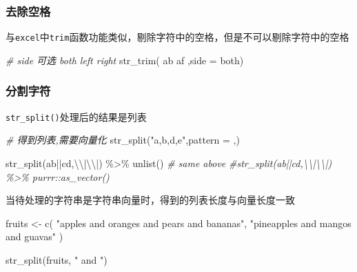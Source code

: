 \documentclass[
]{book}
\newenvironment{Shaded}{\begin{snugshade}}{\end{snugshade}}
\newcommand{\AttributeTok}[1]{\textcolor[rgb]{0.77,0.63,0.00}{#1}}
\newcommand{\CommentTok}[1]{\textcolor[rgb]{0.56,0.35,0.01}{\textit{#1}}}
\newcommand{\FunctionTok}[1]{\textcolor[rgb]{0.00,0.00,0.00}{#1}}
\newcommand{\NormalTok}[1]{#1}
\newcommand{\OtherTok}[1]{\textcolor[rgb]{0.56,0.35,0.01}{#1}}
\newcommand{\SpecialCharTok}[1]{\textcolor[rgb]{0.00,0.00,0.00}{#1}}
\newcommand{\StringTok}[1]{\textcolor[rgb]{0.31,0.60,0.02}{#1}}
\begin{document}
\hypertarget{ux53bbux9664ux7a7aux683c}{%
\subsubsection{去除空格}\label{ux53bbux9664ux7a7aux683c}}

与\texttt{excel}中\texttt{trim}函数功能类似，剔除字符中的空格，但是不可以剔除字符中的空格

\begin{Shaded}
\begin{Highlighting}[]
\CommentTok{\# side 可选 both  left right}
\FunctionTok{str\_trim}\NormalTok{(}\StringTok{\textquotesingle{} ab af \textquotesingle{}}\NormalTok{,}\AttributeTok{side =} \StringTok{\textquotesingle{}both\textquotesingle{}}\NormalTok{)}
\end{Highlighting}
\end{Shaded}

\hypertarget{ux5206ux5272ux5b57ux7b26}{%
\subsubsection{分割字符}\label{ux5206ux5272ux5b57ux7b26}}

\texttt{str\_split()}处理后的结果是列表

\begin{Shaded}
\begin{Highlighting}[]
\CommentTok{\# 得到列表,需要向量化}
\FunctionTok{str\_split}\NormalTok{(}\StringTok{"a,b,d,e"}\NormalTok{,}\AttributeTok{pattern =} \StringTok{\textquotesingle{},\textquotesingle{}}\NormalTok{)}

\FunctionTok{str\_split}\NormalTok{(}\StringTok{\textquotesingle{}ab||cd\textquotesingle{}}\NormalTok{,}\StringTok{\textquotesingle{}}\SpecialCharTok{\textbackslash{}\textbackslash{}}\StringTok{|}\SpecialCharTok{\textbackslash{}\textbackslash{}}\StringTok{|\textquotesingle{}}\NormalTok{) }\SpecialCharTok{\%\textgreater{}\%} \FunctionTok{unlist}\NormalTok{()}
\CommentTok{\# same above}
\CommentTok{\#str\_split(\textquotesingle{}ab||cd\textquotesingle{},\textquotesingle{}\textbackslash{}\textbackslash{}|\textbackslash{}\textbackslash{}|\textquotesingle{}) \%\textgreater{}\% purrr::as\_vector()}
\end{Highlighting}
\end{Shaded}

当待处理的字符串是字符串向量时，得到的列表长度与向量长度一致

\begin{Shaded}
\begin{Highlighting}[]
\NormalTok{fruits }\OtherTok{\textless{}{-}} \FunctionTok{c}\NormalTok{(}
  \StringTok{"apples and oranges and pears and bananas"}\NormalTok{,}
  \StringTok{"pineapples and mangos and guavas"}
\NormalTok{)}

\FunctionTok{str\_split}\NormalTok{(fruits, }\StringTok{" and "}\NormalTok{)}
\end{Highlighting}
\end{Shaded}
\end{document}
